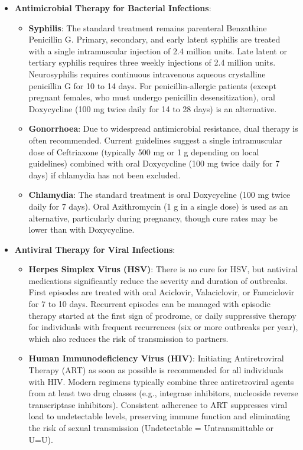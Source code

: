 \begin{itemize}
    \item \textbf{Antimicrobial Therapy for Bacterial Infections}:
    \begin{itemize}
        \item \textbf{Syphilis}: The standard treatment remains parenteral Benzathine Penicillin G. Primary, secondary, and early latent syphilis are treated with a single intramuscular injection of 2.4 million units. Late latent or tertiary syphilis requires three weekly injections of 2.4 million units. Neurosyphilis requires continuous intravenous aqueous crystalline penicillin G for 10 to 14 days. For penicillin-allergic patients (except pregnant females, who must undergo penicillin desensitization), oral Doxycycline (100 mg twice daily for 14 to 28 days) is an alternative.
        \item \textbf{Gonorrhoea}: Due to widespread antimicrobial resistance, dual therapy is often recommended. Current guidelines suggest a single intramuscular dose of Ceftriaxone (typically 500 mg or 1 g depending on local guidelines) combined with oral Doxycycline (100 mg twice daily for 7 days) if chlamydia has not been excluded.
        \item \textbf{Chlamydia}: The standard treatment is oral Doxycycline (100 mg twice daily for 7 days). Oral Azithromycin (1 g in a single dose) is used as an alternative, particularly during pregnancy, though cure rates may be lower than with Doxycycline.
    \end{itemize}
    \item \textbf{Antiviral Therapy for Viral Infections}:
    \begin{itemize}
        \item \textbf{Herpes Simplex Virus (HSV)}: There is no cure for HSV, but antiviral medications significantly reduce the severity and duration of outbreaks. First episodes are treated with oral Aciclovir, Valaciclovir, or Famciclovir for 7 to 10 days. Recurrent episodes can be managed with episodic therapy started at the first sign of prodrome, or daily suppressive therapy for individuals with frequent recurrences (six or more outbreaks per year), which also reduces the risk of transmission to partners.
        \item \textbf{Human Immunodeficiency Virus (HIV)}: Initiating Antiretroviral Therapy (ART) as soon as possible is recommended for all individuals with HIV. Modern regimens typically combine three antiretroviral agents from at least two drug classes (e.g., integrase inhibitors, nucleoside reverse transcriptase inhibitors). Consistent adherence to ART suppresses viral load to undetectable levels, preserving immune function and eliminating the risk of sexual transmission (Undetectable = Untransmittable or U=U).

\end{itemize}
\end{itemize}
